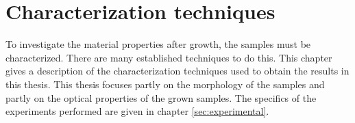 
\chapter{Characterization techniques}
\label{sec:characterization}
To investigate the material properties after growth, the samples must be characterized. There are many established techniques to do this. This chapter gives a description of the characterization techniques used to obtain the results in this thesis. This thesis focuses partly on the morphology of the samples and partly on the optical properties of the grown samples. The specifics of the experiments performed are given in chapter \ref{sec:experimental}.



%

